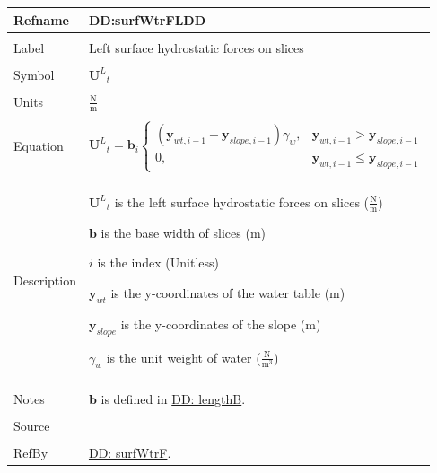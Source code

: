 \documentclass[12pt]{article}
\begin{document}
\noindent \begin{minipage}{\textwidth}
\begin{tabular}{p{} p{}}
\toprule \textbf{Refname} & \textbf{DD:surfWtrFLDD}
\label{DD:surfWtrFLDD}
\\ \midrule \\
Label & Left surface hydrostatic forces on slices
\\ \midrule \\
Symbol & ${{\mathbf{U}^{L}}_{t}}$
\\ \midrule \\
Units & $\frac{\text{N}}{\text{m}}$
\\ \midrule \\
Equation & \begin{displaymath}
           {{\mathbf{U}^{L}}_{t}}={\mathbf{b}}_{i} \begin{cases}
\left({\mathbf{y}_{wt,i-1}}-{\mathbf{y}_{slope,i-1}}\right) {γ_{w}}, & {\mathbf{y}_{wt,i-1}}>{\mathbf{y}_{slope,i-1}}\\
0, & {\mathbf{y}_{wt,i-1}}\leq{}{\mathbf{y}_{slope,i-1}}
\end{cases}
           \end{displaymath}
\\ \midrule \\
Description & \begin{symbDescription}
              \item{${{\mathbf{U}^{L}}_{t}}$ is the left surface hydrostatic forces on slices ($\frac{\text{N}}{\text{m}}$)}
              \item{$\mathbf{b}$ is the base width of slices (m)}
              \item{$i$ is the index (Unitless)}
              \item{${\mathbf{y}_{wt}}$ is the y-coordinates of the water table (m)}
              \item{${\mathbf{y}_{slope}}$ is the y-coordinates of the slope (m)}
              \item{${γ_{w}}$ is the unit weight of water ($\frac{\text{N}}{\text{m}^{3}}$)}
              \end{symbDescription}
\\ \midrule \\
Notes & $\mathbf{b}$ is defined in \hyperref[DD:lengthB]{DD: lengthB}.
\\ \midrule \\
Source & \cite{fredlund1977}
\\ \midrule \\
RefBy & \hyperref[DD:surfWtrF]{DD: surfWtrF}.
\\ \bottomrule \end{tabular}
\end{minipage}
\end{document}
